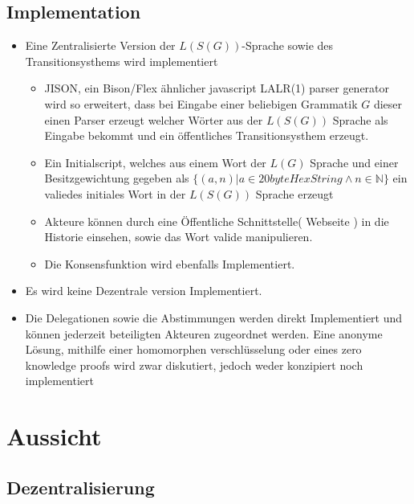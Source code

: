 \documentclass[]{article}
\begin{document}
\subsection*{Implementation}
\begin{itemize}
  \item Eine Zentralisierte Version der $L(S(G))$-Sprache sowie des Transitionsysthems wird implementiert 
  \begin{itemize}
    \item JISON, ein Bison/Flex ähnlicher javascript LALR(1) parser generator wird so erweitert, dass bei Eingabe einer beliebigen Grammatik $G$ dieser einen Parser erzeugt welcher Wörter aus der $L(S(G))$ Sprache als Eingabe bekommt und ein öffentliches Transitionsysthem erzeugt.
    \item Ein Initialscript, welches aus einem Wort der $L(G)$ Sprache und einer Besitzgewichtung gegeben als $\{(a,n)| a\in 20byteHexString \land n\in \mathbb{N} \}$ ein valiedes initiales Wort in der $L(S(G))$ Sprache erzeugt 
    \item Akteure können durch eine Öffentliche Schnittstelle( Webseite ) in die Historie einsehen, sowie das Wort valide manipulieren.
    \item Die Konsensfunktion wird ebenfalls Implementiert.
  \end{itemize}
  \item Es wird keine Dezentrale version Implementiert.
  \item Die Delegationen sowie die Abstimmungen werden direkt Implementiert und können jederzeit beteiligten Akteuren zugeordnet werden. Eine anonyme Lösung, mithilfe einer homomorphen verschlüsselung oder eines zero knowledge proofs wird zwar diskutiert, jedoch weder konzipiert noch implementiert
\end{itemize}




\section{Aussicht}

\subsection{Dezentralisierung}
\end{document}
